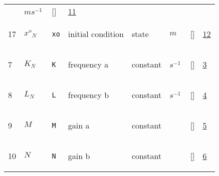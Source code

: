 \begin{longtable}{|p{1cm}|p{3cm}|p{3cm}|p{7cm}|p{3.0cm}|p{3cm}|p{2cm}|p{1cm}|}
             & $ m s^{-1} \, $
             & []
             & \hyperlink{"e:11"}{ 11 }
                 \\
    17
             & \hypertarget{"v:17"}{ $ {{x^o}}{_{N}} $}
             & \verb|xo|
             & initial condition
             & \begin{lay}state \end{lay}
             & $ m  $
             & []
             & \hyperlink{"e:12"}{ 12 }
                 \\
    7
             & \hypertarget{"v:7"}{ $ {K}{_{N}} $}
             & \verb|K|
             & frequency a
             & \begin{lay}constant \end{lay}
             & $ s^{-1} \, $
             & []
             & \hyperlink{"e:3"}{ 3 }
                 \\
    8
             & \hypertarget{"v:8"}{ $ {L}{_{N}} $}
             & \verb|L|
             & frequency b
             & \begin{lay}constant \end{lay}
             & $ s^{-1} \, $
             & []
             & \hyperlink{"e:4"}{ 4 }
                 \\
    9
             & \hypertarget{"v:9"}{ $ {M}{_{}} $}
             & \verb|M|
             & gain a
             & \begin{lay}constant \end{lay}
             & $  $
             & []
             & \hyperlink{"e:5"}{ 5 }
                 \\
    10
             & \hypertarget{"v:10"}{ $ {N}{_{}} $}
             & \verb|N|
             & gain b
             & \begin{lay}constant \end{lay}
             & $  $
             & []
             & \hyperlink{"e:6"}{ 6 }
                 \\
    \end{longtable}